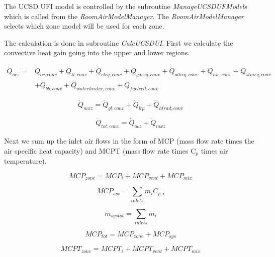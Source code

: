 The UCSD UFI model is controlled by the subroutine \emph{ManageUCSDUFModels} which is called from the \emph{RoomAirModelManager}. The \emph{RoomAirModelManager} selects which zone model will be used for each zone.

The calculation is done in subroutine \emph{CalcUCSDUI}. First we calculate the convective heat gain going into the upper and lower regions.

\begin{equation}
\begin{split}
\dot Q_{ocz} =& \dot Q_{oc,conv} + \dot Q_{tl,conv} + \dot Q_{eleq,conv} + \dot Q_{gaseq,conv} + \dot Q_{otheq,conv} + \dot Q_{hw,conv} + \dot Q_{stmeq,conv} \\
&+ \dot Q_{bb,conv} + \dot Q_{waterheater,conv} + \dot Q_{fuelcell,conv}
\end{split}
\end{equation}

\begin{equation}
{\dot Q_{mxz}} = {\dot Q_{gl,conv}} + {\dot Q_{ltp}} + {\dot Q_{htrad,conv}}
\end{equation}

\begin{equation}
{\dot Q_{tot,conv}} = {\dot Q_{ocz}} + {\dot Q_{mxz}}
\end{equation}

Next we sum up the inlet air flows in the form of MCP (mass flow rate times the air specific heat capacity) and MCPT (mass flow rate times C\(_{p}\) times air temperature).

\begin{equation}
MC{P_{zone}} = MC{P_i} + MC{P_{vent}} + MC{P_{mix}}
\end{equation}

\begin{equation}
MC{P_{sys}} = \sum\limits_{inlets} {{{\dot m}_i}} {C_{p,i}}
\end{equation}

\begin{equation}
{\dot m_{systot}} = \sum\limits_{inlets} {{{\dot m}_i}}
\end{equation}

\begin{equation}
MC{P_{tot}} = MC{P_{zone}} + MC{P_{sys}}
\end{equation}

\begin{equation}
MCP{T_{zone}} = MCP{T_i} + MCP{T_{vent}} + MCP{T_{mix}}
\end{equation}

